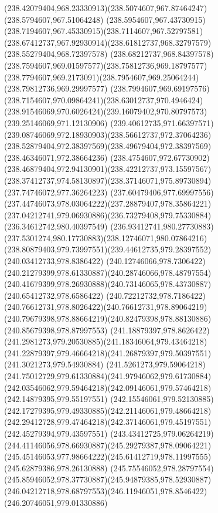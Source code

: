 {{		\curveto(238.42079404,968.23330913)(238.5074607,967.87464247)(238.5794607,967.51064248)
		\curveto(238.5954607,967.43730915)(238.7194607,967.45330915)(238.7114607,967.52797581)
		\curveto(238.67412737,967.92930914)(238.61812737,968.32797579)(238.55279404,968.72397578)
		\curveto(238.68212737,968.84397578)(238.7594607,969.01597577)(238.75812736,969.18797577)
		\curveto(238.7794607,969.2173091)(238.7954607,969.25064244)(238.79812736,969.29997577)
		\curveto(238.7994607,969.69197576)(238.7154607,970.09864241)(238.63012737,970.4946424)
		\curveto(238.91546069,970.6026424)(239.16079402,970.80797573)(239.25146069,971.12130906)
		\curveto(239.40612735,971.66397571)(239.08746069,972.18930903)(238.56612737,972.37064236)
		\curveto(238.52879404,972.38397569)(238.49679404,972.38397569)(238.46346071,972.38664236)
		\curveto(238.4754607,972.67730902)(238.46879404,972.94130901)(238.42212737,973.15597567)
		\curveto(238.37412737,974.58130897)(238.37146071,975.89730894)(237.74746072,977.36264223)
		\curveto(237.60479406,977.69997556)(237.44746073,978.03064222)(237.28879407,978.35864221)
		\curveto(237.04212741,979.06930886)(236.73279408,979.75330884)(236.34612742,980.40397549)
		\curveto(236.93412741,980.27730883)(237.5301274,980.17730883)(238.12746071,980.07864216)
		\curveto(238.80879403,979.73997551)(239.44612735,979.28397552)(240.03412733,978.8386422)
		\curveto(240.12746066,978.7306422)(240.21279399,978.61330887)(240.28746066,978.48797554)
		\curveto(240.41679399,978.26930888)(240.73146065,978.43730887)(240.65412732,978.6586422)
		\curveto(240.72212732,978.7186422)(240.76612731,978.8026422)(240.76612731,978.89064219)
		\curveto(240.79679398,978.88664219)(240.82479398,978.88130886)(240.85679398,978.87997553)
		\curveto(241.18879397,978.8626422)(241.2981273,979.20530885)(241.18346064,979.43464218)
		\curveto(241.22879397,979.46664218)(241.26879397,979.50397551)(241.3021273,979.54930884)
		\curveto(241.5261273,979.59064218)(241.75012729,979.61330884)(241.97946062,979.61730884)
		\curveto(242.03546062,979.59464218)(242.09146061,979.57464218)(242.14879395,979.55197551)
		\curveto(242.15546061,979.52130885)(242.17279395,979.49330885)(242.21146061,979.48664218)
		\curveto(242.29412728,979.47464218)(242.37146061,979.45197551)(242.45279394,979.43597551)
		\curveto(243.43412725,979.06264219)(244.41146056,978.66930887)(245.29279387,978.09064221)
		\curveto(245.45146053,977.98664222)(245.61412719,978.11997555)(245.62879386,978.26130888)
		\curveto(245.75546052,978.28797554)(245.85946052,978.37730887)(245.94879385,978.52930887)
		\curveto(246.04212718,978.68797553)(246.11946051,978.8546422)(246.20746051,979.01330886)
}}

